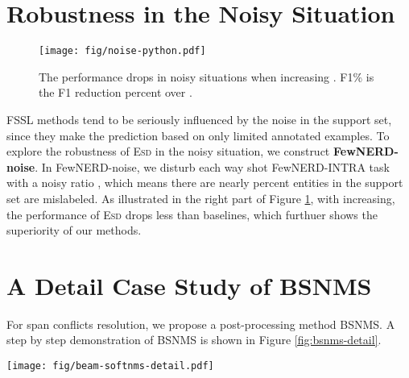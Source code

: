 \documentclass[11pt]{article}
\newcommand{\modelname}{\textsc{Esd}\xspace}
\begin{document}
\section{Robustness in the Noisy Situation}
\begin{figure}[t]
    \centering
    \texttt{[image: fig/noise-python.pdf]}
    \caption{The performance drops in noisy situations when increasing . F1\% is the F1 reduction percent over .
    }
    \label{fig:noise}
\end{figure}
\label{sec:noisy}
FSSL methods tend to be seriously influenced by the noise in the support set, since they make the prediction based on only limited annotated examples.
To explore the robustness of \modelname in the noisy situation, we construct \textbf{FewNERD-noise}.
In FewNERD-noise, we disturb each   way  shot FewNERD-INTRA task with a noisy ratio , which means there are nearly  percent entities in the support set are mislabeled.
As illustrated in the right part of Figure \ref{fig:noise}, with  increasing, the performance of \modelname drops less than baselines, which furthuer shows the superiority of our methods.


\section{A Detail Case Study of BSNMS}
For span conflicts resolution, we propose a post-processing method BSNMS.
A step by step demonstration of BSNMS is shown in Figure \ref{fig:bsnms-detail}.
\label{apx:bsnms}

\begin{figure*}[h]
    \centering
    \texttt{[image: fig/beam-softnms-detail.pdf]}
    \caption{A step by step processing process of BSNMS with beam size=2. For clarity, we set the filter threshold  to , and suppose the span score is always decayed by the overlapped spans with a constant decayed score  . 
    \textbf{STEP1}:create  (beam size) states with spans having larger predicted scores; 
    \textbf{STEP2}: extend all states (i.e., states 1 and 3) in the beam to 1-3, 1-2, 1-4, 3-1, 3-4 and 3-2. Compute DS of the new added span and PS of the new state. As beam size=2, prune states 1-4, 3-4 and 3-2 according to their lower PS. The state 3-1 is dropped since  it is equivalent with the state 1-3;
    \textbf{STEP3}: extend states in the beam (1-3 and 1-2) to 1-3-4, 1-3-2, 1-2-3, 1-2-4, and compute their DS and PS. Filter states 1-3-2, 1-2-3, 1-2-4 since their DS are not greater than , i.e., low DS;
    \textbf{STEP4}: extend states in the beam (only 1-3-4 since the state 1-2 has been extended before) to 1-3-4-2, and filter 1-3-4-2 due to its low DS;
    \textbf{STEP5}: all states in the beam can not extend any more, and select the final state (1-2 in this case) with the largest PS.
    } 
    \label{fig:bsnms-detail}
\end{figure*} 
\end{document}
